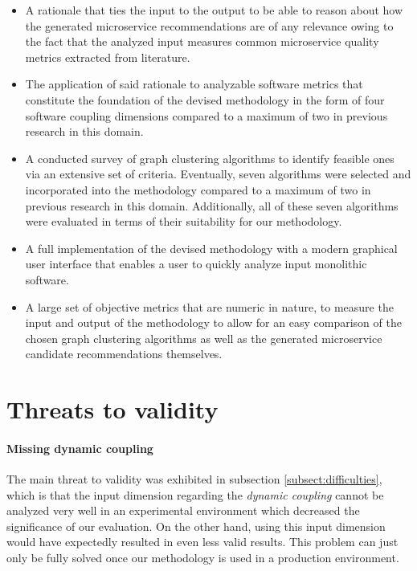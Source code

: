 \documentclass[12pt,a4paper]{report}
\begin{document}
\begin{itemize}
    \item A rationale that ties the input to the output to be able to reason
    about how the generated microservice recommendations are of any relevance
    owing to the fact that the analyzed input measures common microservice
    quality metrics extracted from literature.
    \item The application of said rationale to analyzable software metrics
    that constitute the foundation of the devised methodology in the form
    of four software coupling dimensions compared to a maximum
    of two in previous research in this domain.
    \item A conducted survey of graph clustering algorithms to identify feasible
    ones via an extensive set of criteria. Eventually, seven algorithms were
    selected and incorporated into the methodology compared to a maximum
    of two in previous research in this domain. Additionally, all of these seven
    algorithms were evaluated in terms of their suitability for our methodology.
    \item A full implementation of the devised methodology with a modern
    graphical user interface that enables a user to quickly analyze input
    monolithic software.
    \item A large set of objective metrics that are numeric in nature,
    to measure the input and output of the methodology to allow for an
    easy comparison of the chosen graph clustering algorithms as well as
    the generated microservice candidate recommendations themselves.
\end{itemize}



\section{Threats to validity} \label{sect:threats-to-validity}

\paragraph{Missing dynamic coupling}
The main threat to validity was exhibited
in subsection \ref{subsect:difficulties}, which is that the input dimension
regarding the \textit{dynamic coupling} cannot be analyzed very well in an
experimental environment which decreased the significance of our evaluation. On
the other hand, using this input dimension would have expectedly resulted in
even less valid results. This problem can just only be fully solved once our
methodology is used in a production environment.
\end{document}
